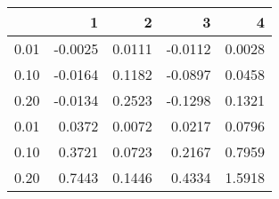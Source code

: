 \begin{tabular}{lrrrr}
\toprule
{} &       1 &       2 &       3 &       4 \\
\midrule
0.01 & -0.0025 &  0.0111 & -0.0112 &  0.0028 \\
0.10 & -0.0164 &  0.1182 & -0.0897 &  0.0458 \\
0.20 & -0.0134 &  0.2523 & -0.1298 &  0.1321 \\
0.01 &  0.0372 &  0.0072 &  0.0217 &  0.0796 \\
0.10 &  0.3721 &  0.0723 &  0.2167 &  0.7959 \\
0.20 &  0.7443 &  0.1446 &  0.4334 &  1.5918 \\
\bottomrule
\end{tabular}
